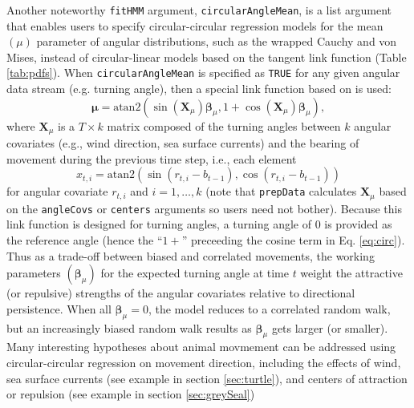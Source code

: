 \documentclass[12pt]{article}\usepackage[]{graphicx}\usepackage[]{color}
\begin{document}
Another noteworthy \verb|fitHMM| argument, \verb|circularAngleMean|, is a list argument that enables users to specify circular-circular regression models for the mean $(\mu)$ parameter of angular distributions, such as the wrapped Cauchy and von Mises, instead of circular-linear models based on the tangent link function (Table \ref{tab:pdfs}). When \verb|circularAngleMean| is specified as \verb|TRUE| for any given angular data stream (e.g. turning angle), then a special link function based on \cite{DuchesneEtAl2015} is used:
\begin{equation}
  {\boldsymbol \mu}=\text{atan2}(\sin({\mathbf X}_\mu){\boldsymbol \beta}_\mu,1+\cos({\mathbf X}_\mu){\boldsymbol \beta}_\mu),
  \label{eq:circ}
\end{equation}
where ${\mathbf X}_\mu$ is a $T \times k$ matrix composed of the turning angles between $k$ angular covariates (e.g., wind direction, sea surface currents) and the bearing of movement during the previous time step, i.e., each element 
\begin{equation}
x_{t,i}=\text{atan2}(\sin(r_{t,i}-b_{t-1}),\cos(r_{t,i}-b_{t-1})) 
  \label{eq:angleCov}
\end{equation}
for angular covariate $r_{t,i}$ and $i=1,\ldots,k$ (note that \verb|prepData| calculates ${\mathbf X}_\mu$ based on the \verb|angleCovs| or \verb|centers| arguments so users need not bother). Because this link function is designed for turning angles, a turning angle of 0 is provided as the reference angle (hence the ``$1+$'' preceeding the cosine term in Eq. \ref{eq:circ}).  Thus as a trade-off between biased and correlated movements, the working parameters $({\boldsymbol \beta}_\mu)$ for the expected turning angle at time $t$ weight the attractive (or repulsive) strengths of the angular covariates relative to directional persistence.  When all ${\boldsymbol \beta}_\mu=0$, the model reduces to a correlated random walk, but an increasingly biased random walk results as ${\boldsymbol \beta}_\mu$ gets larger (or smaller). Many interesting hypotheses about animal movmement can be addressed using circular-circular regression on movement direction, including the effects of wind, sea surface currents (see example in section \ref{sec:turtle}), and centers of attraction or repulsion (see example in section \ref{sec:greySeal})
\end{document}
